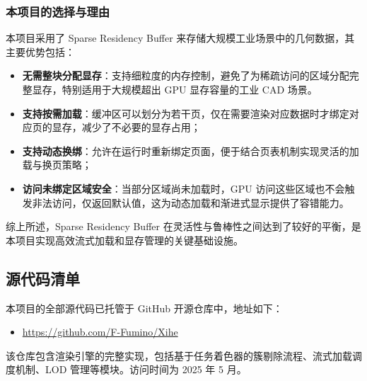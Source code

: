 {    \subsubsection{本项目的选择与理由}
    本项目采用了 Sparse Residency Buffer 来存储大规模工业场景中的几何数据，其主要优势包括：

    \begin{itemize}
        \item \textbf{无需整块分配显存}：支持细粒度的内存控制，避免了为稀疏访问的区域分配完整显存，特别适用于大规模超出 GPU 显存容量的工业 CAD 场景。

        \item \textbf{支持按需加载}：缓冲区可以划分为若干页，仅在需要渲染对应数据时才绑定对应页的显存，减少了不必要的显存占用；

        \item \textbf{支持动态换绑}：允许在运行时重新绑定页面，便于结合页表机制实现灵活的加载与换页策略；
        
        \item \textbf{访问未绑定区域安全}：当部分区域尚未加载时，GPU 访问这些区域也不会触发非法访问，仅返回默认值，这为动态加载和渐进式显示提供了容错能力。
    \end{itemize}

    综上所述，Sparse Residency Buffer 在灵活性与鲁棒性之间达到了较好的平衡，是本项目实现高效流式加载和显存管理的关键基础设施。

    \subsection{源代码清单}

    本项目的全部源代码已托管于 GitHub 开源仓库中，地址如下：

    \begin{itemize}
    \item \url{https://github.com/F-Fumino/Xihe}
    \end{itemize}

    该仓库包含渲染引擎的完整实现，包括基于任务着色器的簇剔除流程、流式加载调度机制、LOD 管理等模块。访问时间为 2025 年 5 月。

    \removeappendixsubsecmajornumbering
}